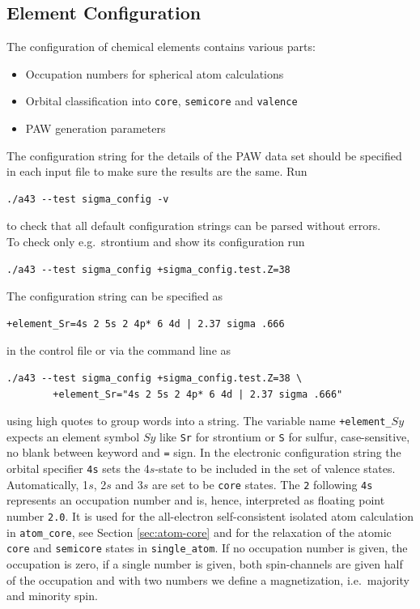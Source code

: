 \documentclass[oribibl]{llncs}
\newcommand{\ttt}[1]{\texttt{#1}}
\begin{document}
\subsection{Element Configuration} \label{sec:sigma-config}
%
The configuration of chemical elements contains various parts:
\begin{itemize}
  \item Occupation numbers for spherical atom calculations
  \item Orbital classification into \ttt{core}, \ttt{semicore} and \ttt{valence}
  \item \ac{PAW} generation parameters
\end{itemize}
%
\noindent
The configuration string for the details of the \ac{PAW} data set should be 
specified in each input file to make sure the results are the same. Run
\begin{verbatim}
./a43 --test sigma_config -v
\end{verbatim}
to check that all default configuration strings can be parsed without errors.
\\
To check only e.g.~strontium and show its configuration run
\begin{verbatim}
./a43 --test sigma_config +sigma_config.test.Z=38
\end{verbatim}
The configuration string can be specified as
\begin{verbatim}
+element_Sr=4s 2 5s 2 4p* 6 4d | 2.37 sigma .666
\end{verbatim}
in the control file or via the command line as
\begin{verbatim}
./a43 --test sigma_config +sigma_config.test.Z=38 \
        +element_Sr="4s 2 5s 2 4p* 6 4d | 2.37 sigma .666"
\end{verbatim}
using high quotes to group words into a string.
The variable name \ttt{+element\_}$Sy$ expects an element symbol $Sy$ 
like \ttt{Sr} for strontium or \ttt{S} for sulfur, case-sensitive, no blank between keyword and \ttt{=} sign.
In the electronic configuration string the orbital specifier \ttt{4s} sets the 4$s$-state to be 
included in the set of valence states. Automatically, 1$s$, 2$s$ and 3$s$ are set to 
be \ttt{core} states.
The \ttt{2} following \ttt{4s} represents an occupation number
and is, hence, interpreted as floating point number \ttt{2.0}.
It is used for the all-electron self-consistent isolated atom calculation in \ttt{atom\_core}, see Section \ref{sec:atom-core}
and for the relaxation of the atomic \ttt{core} and \ttt{semicore} states in \ttt{single\_atom}.
If no occupation number is given, the occupation is zero, if a single number is given,
both spin-channels are given half of the occupation and with two numbers
we define a magnetization, i.e.~majority and minority spin.
\end{document}
